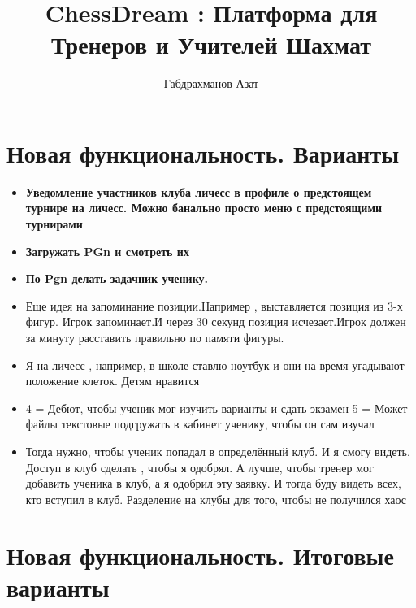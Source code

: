 \documentclass[a4paper,12pt]{article}
\title{ChessDream : Платформа для Тренеров и Учителей Шахмат}
\author{Габдрахманов Азат}
\date{}
\begin{document}
\maketitle
\tableofcontents
\newpage

\section{Новая функциональность. Варианты}

\begin{itemize}
    \item \textbf{Уведомление участников клуба личесс в профиле о предстоящем турнире на личесс. Можно банально просто меню с предстоящими турнирами}
    \item \textbf{Загружать PGn и смотреть их}
    \item \textbf{По Pgn делать задачник ученику.}
    \item Еще идея на запоминание позиции.Например , выставляется позиция из 3-х фигур. Игрок запоминает.И через 30 секунд позиция исчезает.Игрок должен за минуту расставить правильно по памяти фигуры.
    \item Я на личесс , например, в школе ставлю ноутбук и они на время угадывают положение клеток. Детям нравится
    \item 4 = Дебют, чтобы ученик мог изучить варианты и сдать экзамен
5 =  Может файлы текстовые подгружать в кабинет ученику, чтобы он сам изучал
    \item Тогда нужно, чтобы ученик попадал в определённый клуб. И я смогу видеть.
Доступ в клуб сделать , чтобы я одобрял.
А лучше, чтобы тренер мог добавить ученика в клуб, а я одобрил эту заявку.
И тогда буду видеть всех, кто вступил в клуб.
Разделение на клубы для того, чтобы не получился хаос
\end{itemize}

\section{Новая функциональность. Итоговые варианты}
\end{document}
